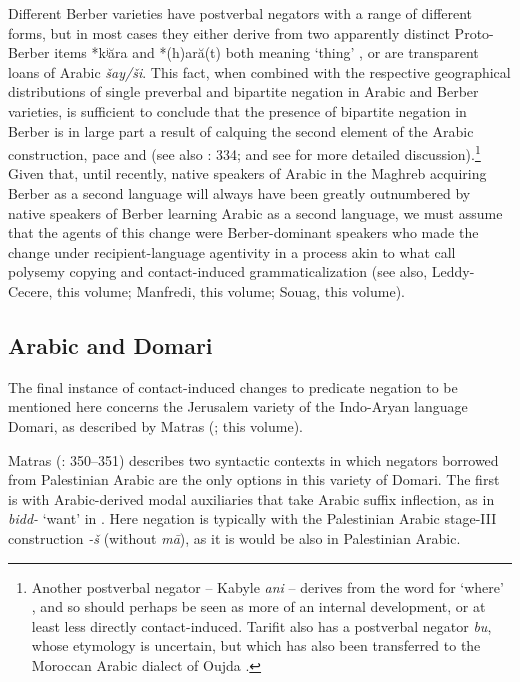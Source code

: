 \documentclass[output=paper]{langsci/langscibook}
\begin{document}
{Different Berber varieties have postverbal negators with a range of different forms, but in most cases they either derive from two apparently distinct Proto-Berber items *kʲăra and *(h)ară(t) both meaning ‘thing’ \citep[332]{Kossmann2013book}, or are transparent loans of Arabic \textit{šay/ši}. This fact, when combined with the respective geographical distributions of single preverbal and bipartite negation in Arabic and Berber varieties, is sufficient to conclude that the presence of bipartite negation in Berber is in large part a result of calquing the second element of the Arabic construction, pace \citet{Brugnatelli1987} and \citet{Lafkioui2013reinventing} (see also \citealt{Kossmann2013book}: 334; and see \citealt{Lucas2007,Lucas2009} for more detailed discussion).\footnote{Another postverbal negator – Kabyle \textit{ani} – derives from the word for ‘where’ \citep{Rabhi1992}, and so should perhaps be seen as more of an internal development, or at least less directly contact-induced. Tarifit also has a postverbal negator \textit{bu}, whose etymology is uncertain, but which has also been transferred to the Moroccan Arabic dialect of Oujda \citep{Lafkioui2013bu}.} Given that, until recently, native speakers of Arabic in the Maghreb acquiring Berber as a second language will always have been greatly outnumbered by native speakers of Berber learning Arabic as a second language, we must assume that the agents of this change were Berber-dominant speakers who made the change under recipient-language agentivity in a process akin to what \citet{HeineKuteva2005} call polysemy copying and contact-induced grammaticalization (see also, Leddy-Cecere, this volume; Manfredi, this volume; Souag, this volume).}


\subsection{Arabic and Domari}


The final instance of contact-induced changes to predicate negation to be mentioned here concerns the Jerusalem variety of the Indo-Aryan language Domari, as described by Matras (\citeyear{Matras1999,Matras2007Domari,Matras2012}; this volume). 

Matras (\citeyear{Matras2012}: 350–351) describes two syntactic contexts in which negators borrowed from Palestinian Arabic are the only options in this variety of Domari. The first is with Arabic-derived modal auxiliaries that take Arabic suffix inflection, as in \textit{bidd-} ‘want’ in . Here negation is typically with the Palestinian Arabic stage-III construction \textit{{}-š} (without \textit{mā}), as it is would be also in Palestinian Arabic.
\end{document}
